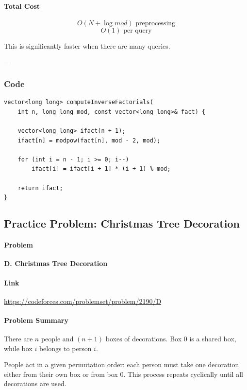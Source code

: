 \documentclass[11pt]{article}
\begin{document}
\paragraph{Total Cost}
\[
O(N + \log mod) \text{ preprocessing}
\]
\[
O(1) \text{ per query}
\]

This is significantly faster when there are many queries.

---

\subsubsection{Code}
\begin{lstlisting}
vector<long long> computeInverseFactorials(
    int n, long long mod, const vector<long long>& fact) {

    vector<long long> ifact(n + 1);
    ifact[n] = modpow(fact[n], mod - 2, mod);

    for (int i = n - 1; i >= 0; i--)
        ifact[i] = ifact[i + 1] * (i + 1) % mod;

    return ifact;
}
\end{lstlisting}

\subsection{Practice Problem: Christmas Tree Decoration}

\paragraph{Problem}
\textbf{D. Christmas Tree Decoration}

\paragraph{Link}
\url{https://codeforces.com/problemset/problem/2190/D}

\paragraph{Problem Summary}

There are $n$ people and $(n+1)$ boxes of decorations.
Box $0$ is a shared box, while box $i$ belongs to person $i$.

People act in a given permutation order:
each person must take one decoration either from their own box or from box $0$.
This process repeats cyclically until all decorations are used.
\end{document}
